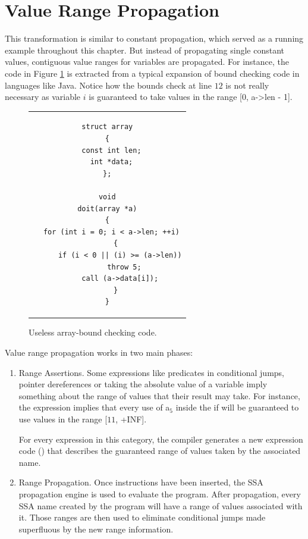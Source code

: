 \section{Value Range Propagation}
\label{novillo:sec:vrp}

This transformation is similar to constant propagation, which served as a
running example throughout this chapter. But instead of propagating single
constant values, contiguous value ranges for variables are propagated. For
instance, the code in Figure \ref{novillo:fig:vrp-1} is extracted from a
typical expansion of bound checking code in languages like Java. Notice how the
bounds check at line $12$ is not really necessary as variable $i$
is guaranteed to take values in the range [$0$, a-\textgreater len - 1].

\begin{figure}
  \begin{center}
    \begin{tabular}{c}
      \begin{lstlisting}
struct array
{
  const int len;
  int *data;
};

void
doit(array *a)
{
  for (int i = 0; i < a->len; ++i)
    {
      if (i < 0 || (i) >= (a->len))
        throw 5;
      call (a->data[i]);
    }
}
      \end{lstlisting}
    \end{tabular}
  \end{center}
  \caption{Useless array-bound checking code.}
  \label{novillo:fig:vrp-1}
\end{figure}

Value range propagation works in two main phases:

\begin{enumerate}
\item	Range Assertions.  Some expressions like predicates in
	conditional jumps, pointer dereferences or taking the
	absolute value of a variable imply something about the
	range of values that their result may take.  For
	instance, the expression 
	implies that every use of a$_5$ inside the if will be
	guaranteed to use values in the range [$11$, +INF].

	For every expression in this category, the compiler
	generates a new expression code ()
	that describes the guaranteed range of values taken by
	the associated name.

\item	Range Propagation.  Once  instructions
	have been inserted, the SSA propagation engine is used to
	evaluate the program.  After propagation, every SSA name
	created by the program will have a range of values
	associated with it.  Those ranges are then used to
	eliminate conditional jumps made superfluous by the new
	range information.
\end{enumerate}

